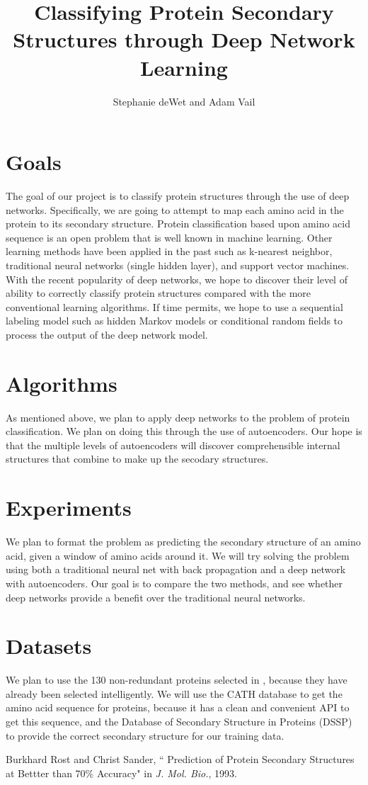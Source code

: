 \documentclass[]{article}
\title{Classifying Protein Secondary Structures through Deep Network Learning}
\author{Stephanie deWet and Adam Vail}
\begin{document}
\maketitle

\section{Goals}
The goal of our project is to classify protein structures through the use of deep networks.
Specifically, we are going to attempt to map each amino acid in the protein to its secondary structure.
Protein classification based upon amino acid sequence is an open problem that is well known in machine learning.
Other learning methods have been applied in the past such as k-nearest neighbor, traditional neural networks (single hidden layer), and support vector machines.
With the recent popularity of deep networks, we hope to discover their level of ability to correctly classify protein structures compared with the more conventional learning algorithms.
If time permits, we hope to use a sequential labeling model such as hidden Markov models or conditional random fields to process the output of the deep network model.

\section{Algorithms}
As mentioned above, we plan to apply deep networks to the problem of protein classification.
We plan on doing this through the use of autoencoders.
Our hope is that the multiple levels of autoencoders will discover comprehensible internal structures that combine to make up the secodary structures.

\section{Experiments}
We plan to format the problem as predicting the secondary structure of an amino acid, given a window of amino acids around it.
We will try solving the problem using both a traditional neural net with back propagation and a deep network with autoencoders.
Our goal is to compare the two methods, and see whether deep networks provide a benefit over the traditional neural networks.

\section{Datasets}
We plan to use the 130 non-redundant proteins selected in \cite{Rost}, because they have already been selected intelligently.
We will use the CATH database to get the amino acid sequence for proteins, because it has a clean and convenient API to get this sequence, and
the Database of Secondary Structure in Proteins (DSSP) to provide the correct secondary structure for our training data. 

\begin{thebibliography}{9}

Burkhard Rost and Christ Sander,
  `` Prediction of Protein Secondary Structures at Bettter than 70\% Accuracy"
  in \emph{J. Mol. Bio.}, 1993.

\end{thebibliography}
\end{document}
